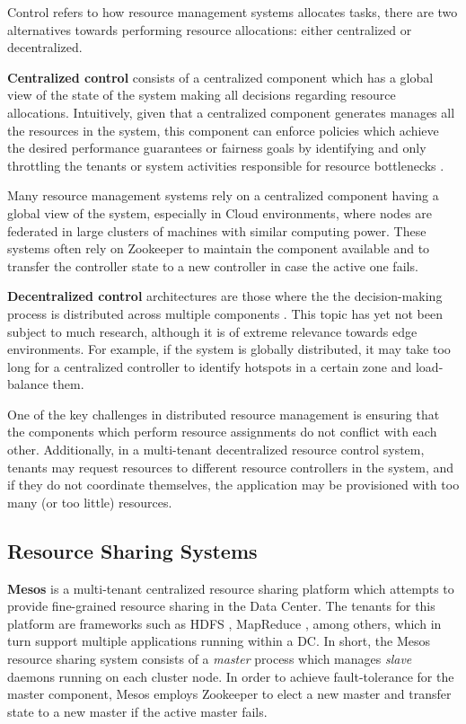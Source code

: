 Control refers to how resource management systems allocates tasks, there are two alternatives towards performing resource allocations: either centralized or decentralized.

\textbf{Centralized control} consists of a centralized component which has a global view of the state of the system making all decisions regarding resource allocations. Intuitively, given that a centralized component generates manages all the resources in the system, this component can enforce policies which achieve the desired performance guarantees or fairness goals by identifying and only throttling the tenants or system activities responsible for resource bottlenecks \cite{verma2015large}.

Many resource management systems rely on a centralized component having a global view of the system, especially in Cloud environments, where nodes are federated in large clusters of machines with similar computing power. These systems often rely on Zookeeper \cite{hunt2010zookeeper} to maintain the component available and to transfer the controller state to a new controller in case the active one fails.

\textbf{Decentralized control} architectures are those where the the decision-making process is distributed across multiple components \cite{Hong2019}. This topic has yet not been subject to much research, although it is of extreme relevance towards edge environments. For example, if the system is globally distributed, it may take too long for a centralized controller to identify hotspots in a certain zone and load-balance them.

One of the key challenges in distributed resource management is ensuring that the components which perform resource assignments do not conflict with each other. Additionally, in a multi-tenant decentralized resource control system, tenants may request resources to different resource controllers in the system, and if they do not coordinate themselves, the application may be provisioned with too many (or too little) resources.

\subsection{Resource Sharing Systems}

\textbf{Mesos} \cite{hindman2011mesos} is a multi-tenant centralized resource sharing platform which attempts to provide fine-grained resource sharing in the Data Center. The tenants for this platform are frameworks such as HDFS \cite{borthakur2008hdfs}, MapReduce \cite{dean2008mapreduce}, among others, which in turn support multiple applications running within a DC. In short, the Mesos resource sharing system consists of a \textit{master} process which manages \textit{slave} daemons running on each cluster node. In order to achieve fault-tolerance for the master component, Mesos employs Zookeeper \cite{hunt2010zookeeper} to elect a new master and transfer state to a new master if the active master fails.


